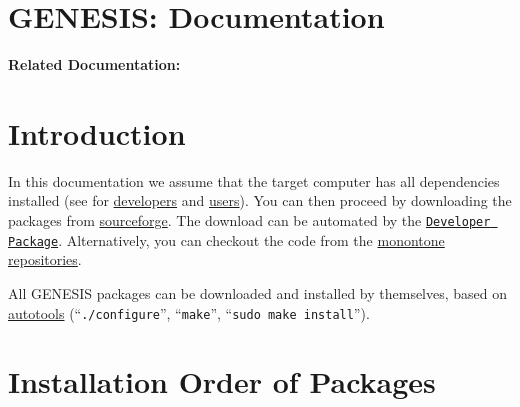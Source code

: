 \documentclass[12pt]{article}
\begin{document}
\section*{GENESIS: Documentation}

{\bf Related Documentation:}

\section*{Introduction}

In this documentation we assume that the target computer has all
dependencies installed (see for
\href{../installation-developer/installation-developer.tex}{developers}
and \href{../installation-user/installation-user.tex}{users}). You can
then proceed by downloading the packages from
\href{http://sourceforge.net/project/showfiles.php?group_id=162899}{sourceforge}.
The download can be automated by the
\href{../developer-package/developer-package.tex}{\tt Developer
  Package}. Alternatively, you can checkout the code from the
\href{http://monotone.ca/}{monontone}
\href{../developers-intro/developers-intro.tex}{repositories}.

All GENESIS packages can be downloaded and installed by themselves,
based on \href{http://www.gnu.org/software/autoconf/}{autotools}
(``{\tt ./configure}'', ``{\tt make}'', ``{\tt sudo make install}'').



\section*{Installation Order of Packages}
\end{document}
